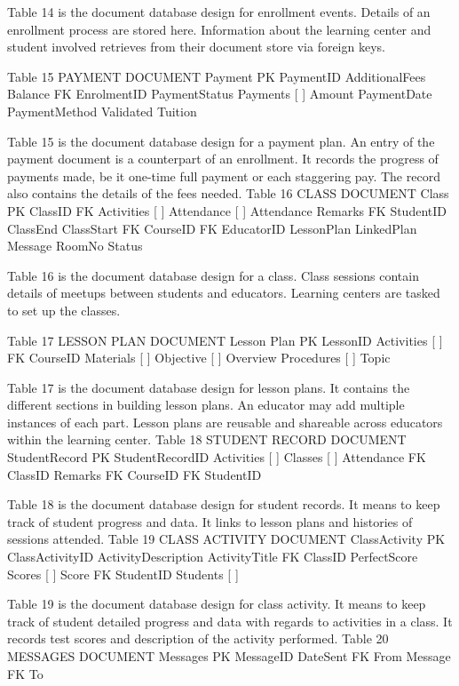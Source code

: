 Table 14 is the document database design for enrollment events. Details of an enrollment process are stored here. Information about the learning center and student involved retrieves from their document store via foreign keys.



Table 15
PAYMENT DOCUMENT
Payment
PK	PaymentID
 	AdditionalFees
 	Balance
FK	EnrolmentID
 	PaymentStatus
 	Payments [ ] { }
 	 	Amount
 		PaymentDate
 		PaymentMethod
 		Validated
 	Tuition	 

Table 15 is the document database design for a payment plan. An entry of the payment document is a counterpart of an enrollment. It records the progress of payments made, be it one-time full payment or each staggering pay. The record also contains the details of the fees needed.
Table 16
CLASS DOCUMENT
Class
PK	ClassID
FK	Activities [ ]
 	Attendance [ ] { }
 	 	Attendance
 		Remarks
FK		StudentID
 	ClassEnd
 	ClassStart
FK	CourseID
FK	EducatorID
 	LessonPlan
 	LinkedPlan
 	Message
 	RoomNo
 	Status

Table 16 is the document database design for a class. Class sessions contain details of meetups between students and educators. Learning centers are tasked to set up the classes.

Table 17
LESSON PLAN DOCUMENT
Lesson Plan
PK	LessonID
 	Activities [ ]
FK	CourseID
 	Materials [ ]
 	Objective [ ]
 	Overview
 	Procedures [ ]
 	Topic

Table 17 is the document database design for lesson plans. It contains the different sections in building lesson plans. An educator may add multiple instances of each part. Lesson plans are reusable and shareable across educators within the learning center. 
Table 18
STUDENT RECORD DOCUMENT
StudentRecord
PK	StudentRecordID
 	Activities [ ]
 	Classes [ ] { }
 	 	Attendance
FK		ClassID
 		Remarks
FK	CourseID
FK	StudentID

Table 18 is the document database design for student records. It means to keep track of student progress and data. It links to lesson plans and histories of sessions attended. 
Table 19
CLASS ACTIVITY DOCUMENT
ClassActivity
PK	ClassActivityID
 	ActivityDescription
 	ActivityTitle
FK	ClassID
 	PerfectScore
 	Scores [ ] { }
 	 	  Score
FK		  StudentID
 	Students [ ]

Table 19 is the document database design for class activity. It means to keep track of student detailed progress and data with regards to activities in a class. It records test scores and description of the activity performed.
Table 20
MESSAGES DOCUMENT
Messages
PK	MessageID
 	DateSent
FK	From
 	Message
FK	To


